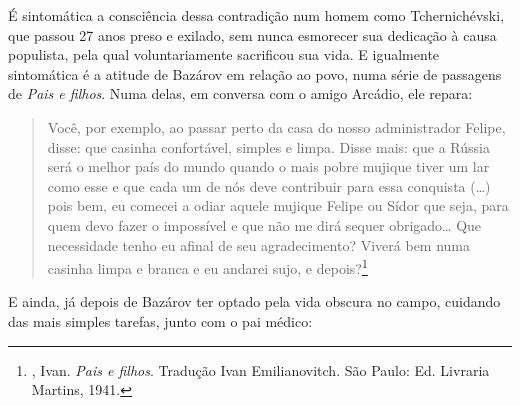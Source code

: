 É sintomática a consciência dessa contradição num homem como
Tchernichévski, que passou 27 anos preso e exilado, sem nunca esmorecer
sua dedicação à causa populista, pela qual voluntariamente sacrificou sua
vida. E igualmente sintomática é a atitude de Bazárov em relação ao povo, numa
série de passagens de \emph{Pais e filhos}. Numa delas, em conversa com o amigo Arcádio, ele
repara:

\begin{quotation}
Você, por exemplo, ao passar perto da casa do nosso administrador
Felipe, disse: que casinha confortável, simples e limpa. Disse mais: que
a Rússia será o melhor país do mundo quando o mais pobre mujique tiver
um lar como esse e que cada um de nós deve contribuir para essa
conquista (\ldots{}) pois bem, eu comecei a odiar aquele mujique Felipe ou
Sídor que seja, para quem devo fazer o impossível e que não me dirá
sequer obrigado\ldots{} Que necessidade tenho eu afinal de seu
agradecimento? Viverá bem numa casinha limpa e branca e eu andarei sujo,
e depois?\footnote{, Ivan. \emph{Pais e filhos}. Tradução Ivan Emilianovitch. São Paulo: Ed. Livraria Martins, 1941.} 
\end{quotation}

E ainda, já depois de Bazárov ter optado pela vida obscura no campo, cuidando das mais simples tarefas, junto com o pai médico:

